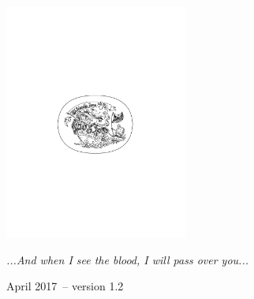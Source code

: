 \documentclass[10pt,oneside,footinclude=true,headinclude=true]{scrbook} %
\begin{document}
\begin{titlepage}
\begin{center}
\large \hfill \vfill

\begingroup
\color{RoyalPurple} \\ \bigskip %
\endgroup

\vfill
\includegraphics[width=6cm]{TFZsuperellipse_bw} \\ \medskip %

\textit{...And when I see the blood, I will pass over you...} \\ \medskip %

April 2017\ -- version 1.2 %

\vfill
\end{center}
\end{titlepage}
    
\newpage
\clearscrheadfoot
\null

\tableofcontents 
\cleardoublepage %
\end{document}
